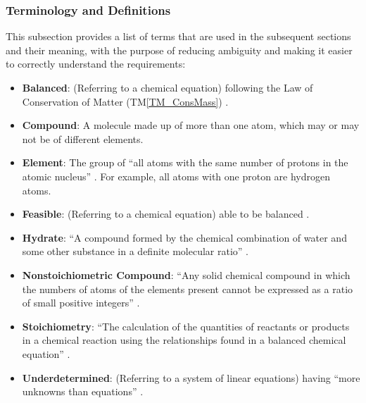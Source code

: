 \documentclass[12pt]{article}
\newcommand{\tmref}[1]{TM\ref{#1}}
\begin{document}
\subsubsection{Terminology and  Definitions} \label{sec_termsDefs}
This subsection provides a list of terms that are used in the subsequent
sections and their meaning, with the purpose of reducing ambiguity and making it
easier to correctly understand the requirements:

\begin{itemize}
  \item \textbf{Balanced}: (Referring to a chemical equation) following the Law
        of Conservation of Matter (\tmref{TM_ConsMass})
        \cite{lund_introduction_2023}.

  \item \textbf{Compound}: A molecule made up of more than one atom, which may
        or may not be of different elements.

  \item \textbf{Element}: The group of ``all atoms with the same number of
        protons in the atomic nucleus'' \cite{hartshorn_brief_2015}. For
        example, all atoms with one proton are hydrogen atoms.

  \item \textbf{Feasible}: (Referring to a chemical equation) able to be
        balanced \cite{hamid_balancing_2019}.

  \item \textbf{Hydrate}: ``A compound formed by the chemical combination of water
        and some other substance in a definite molecular ratio''
        \cite{harpercollins_publishers_hydrate_nodate}.

  \item \textbf{Nonstoichiometric Compound}: ``Any solid chemical compound in
        which the numbers of atoms of the elements present cannot be expressed as a
        ratio of small positive integers''
        \cite{the_editors_of_encyclopaedia_britannica_nonstoichiometric_2010}.

  \item \textbf{Stoichiometry}: ``The calculation of the quantities of reactants
        or products in a chemical reaction using the relationships found in a balanced
        chemical equation'' \cite[p. 337]{lund_introduction_2023}.

  \item \textbf{Underdetermined}: (Referring to a system of linear equations)
        having ``more unknowns than equations'' \cite{colbry_matrix_2023}.

\end{itemize}
\end{document}
